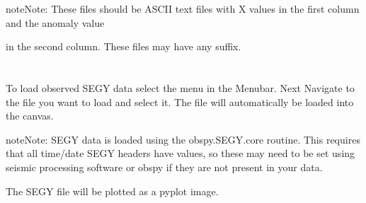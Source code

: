 \documentclass[a4paper,12pt,english]{sphinxmanual}
\begin{document}
\begin{sphinxadmonition}{note}{Note:}
These files should be ASCII text files with X values in the first column and the anomaly value
\end{sphinxadmonition}

in the second column. These files may have any suffix.


\section{}
\label{\detokenize{manual__segy::doc}}\label{\detokenize{manual__segy:segy-data}}

\subsection{}
\label{\detokenize{manual__segy:loading-segy-data}}
To load observed SEGY data select the  menu in the Menubar.
Next Navigate to the file you want to load and select it.
The file will automatically be loaded into the canvas.

\begin{sphinxadmonition}{note}{Note:}
SEGY data is loaded using the obspy.SEGY.core routine. This requires that all time/date SEGY headers have values,
so these may need to be set using seismic processing software or obspy if they are not present in your data.

The SEGY file will be plotted as a pyplot image.
\end{sphinxadmonition}


\section{}
\label{\detokenize{manual__geology::doc}}\label{\detokenize{manual__geology:geologic-data}}

\subsection{}
\label{\detokenize{manual__geology:loading-geologic-data}}

\section{}
\label{\detokenize{manual__export_figure::doc}}\label{\detokenize{manual__export_figure:export-figure}}
\end{document}

